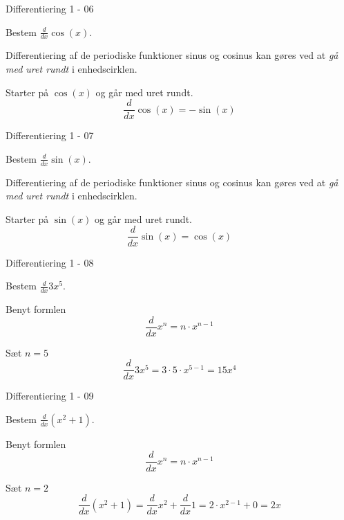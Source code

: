 \documentclass{article}
\begin{document}
\begin{exercise}{Differentiering 1 - 06}
	
	Bestem $\frac{d}{dx} \cos(x) $.
	
	
	\hint
	
	Differentiering af de periodiske funktioner sinus og cosinus kan gøres ved at \emph{gå med uret rundt} i enhedscirklen.
	
	\hint 
	
	Starter på $\cos(x)$ og går med uret rundt.
	\[
	\frac{d}{dx} \cos(x) = -\sin(x)
	\]
	

	
\end{exercise}

\begin{exercise}{Differentiering 1 - 07}
	
	Bestem $\frac{d}{dx} \sin(x) $.


\hint

Differentiering af de periodiske funktioner sinus og cosinus kan gøres ved at \emph{gå med uret rundt} i enhedscirklen.

\hint 

Starter på $\sin(x)$ og går med uret rundt.
\[
\frac{d}{dx} \sin(x) = \cos(x)
\]


\end{exercise}

\begin{exercise}{Differentiering 1 - 08}
	
	Bestem $\frac{d}{dx} 3 x^5$.
	
	
	\hint
	
	Benyt formlen
	\[
	\frac{d}{dx} x^n = n \cdot x^{n - 1}
	\]
	
	\hint
	
	Sæt $n = 5$
	\[
	\frac{d}{dx} 3 x^5 = 3 \cdot 5 \cdot x^{5 - 1} = 15 x^4
	\]
\end{exercise}

\begin{exercise}{Differentiering 1 - 09}
	
	Bestem $\frac{d}{dx} \left(x^2 + 1 \right)$.
	
	
	\hint
	
	Benyt formlen
	\[
	\frac{d}{dx} x^n = n \cdot x^{n - 1}
	\]
	
	\hint
	
	Sæt $n = 2$
	\[
	\frac{d}{dx} \left(x^2 + 1 \right) = \frac{d}{dx} x^2 + \frac{d}{dx} 1 =  2 \cdot x^{2 - 1} + 0 = 2 x
	\]
\end{exercise}
\end{document}
